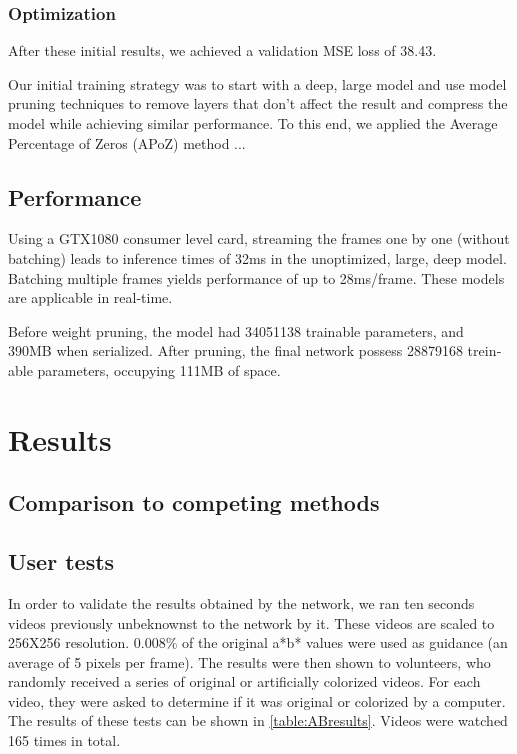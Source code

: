 \documentclass[12pt,openright,oneside,a4paper,english]{abntex2}
\begin{document}
\begin{otherlanguage}{english}
\subsection{Optimization}
After these initial results, we achieved a validation MSE loss of 38.43.

Our initial training strategy was to start with a deep, large model and use model pruning techniques to remove layers that don't affect the result and compress the model while achieving similar performance. To this end, we applied the Average Percentage of Zeros (APoZ) method ...

\section{Performance}
Using a GTX1080 consumer level card, streaming the frames one by one (without batching) leads to inference times of 32ms in the unoptimized, large, deep model. Batching multiple frames yields performance of up to 28ms/frame. These models are applicable in real-time.

Before weight pruning, the model had 34051138 trainable parameters, and 390MB when serialized. After pruning, the final network possess 28879168 treinable parameters, occupying 111MB of space.

\chapter{Results}

\section{Comparison to competing methods}


\section{User tests}

In order to validate the results obtained by the network, we ran ten seconds videos previously unbeknownst to the network by it. These videos are scaled to 256X256 resolution. 0.008\% of the original a*b* values were used as guidance (an average of 5 pixels per frame). The results were then shown to volunteers, who randomly received a series of original or artificially colorized videos. For each video, they were asked to determine if it was original or colorized by a computer. The results of these tests can be shown in \ref{table:ABresults}. Videos were watched 165 times in total.


\end{otherlanguage}
\end{document}
